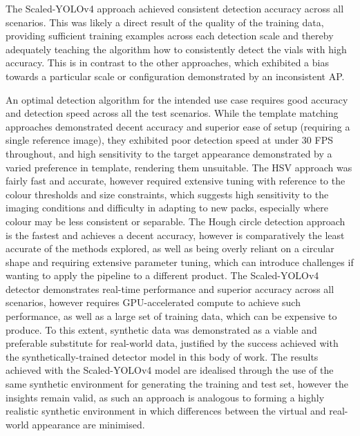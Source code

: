 \documentclass[10pt]{article}
\begin{document}
The Scaled-YOLOv4 approach achieved consistent detection accuracy across all scenarios. This was likely a direct result of the quality of the training data, providing sufficient training examples across each detection scale and thereby adequately teaching the algorithm how to consistently detect the vials with high accuracy. This is in contrast to the other approaches, which exhibited a bias towards a particular scale or configuration demonstrated by an inconsistent AP.

An optimal detection algorithm for the intended use case requires good accuracy and detection speed across all the test scenarios. While the template matching approaches demonstrated decent accuracy and superior ease of setup (requiring a single reference image), they exhibited poor detection speed at under 30 FPS throughout, and high sensitivity to the target appearance demonstrated by a varied preference in template, rendering them unsuitable. The HSV approach was fairly fast and accurate, however required extensive tuning with reference to the colour thresholds and size constraints, which suggests high sensitivity to the imaging conditions and difficulty in adapting to new packs, especially where colour may be less consistent or separable. The Hough circle detection approach is the fastest and achieves a decent accuracy, however is comparatively the least accurate of the methods explored, as well as being overly reliant on a circular shape and requiring extensive parameter tuning, which can introduce challenges if wanting to apply the pipeline to a different product. The Scaled-YOLOv4 detector demonstrates real-time performance and superior accuracy across all scenarios, however requires GPU-accelerated compute to achieve such performance, as well as a large set of training data, which can be expensive to produce. To this extent, synthetic data was demonstrated as a viable and preferable substitute for real-world data, justified by the success achieved with the synthetically-trained detector model in this body of work. The results achieved with the Scaled-YOLOv4 model are idealised through the use of the same synthetic environment for generating the training and test set, however the insights remain valid, as such an approach is analogous to forming a highly realistic synthetic environment in which differences between the virtual and real-world appearance are minimised.
\end{document}
